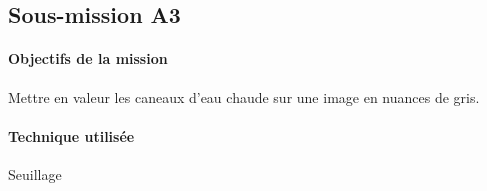 \subsection{Sous-mission A3}

	\begin{vwcol}[widths={0.65,0.2}, rule=0pt]
	\begin{minipage}{0.7\textwidth}
	\paragraph{Objectifs de la mission}

	Mettre en valeur les caneaux d'eau chaude sur une image en nuances de gris.
	\end{minipage}

	\begin{minipage}{0.25\textwidth}
	\begin{flushright}
	\paragraph{Technique utilisée}
	
	Seuillage
	\end{flushright}
	\end{minipage}

	\end{vwcol} 

